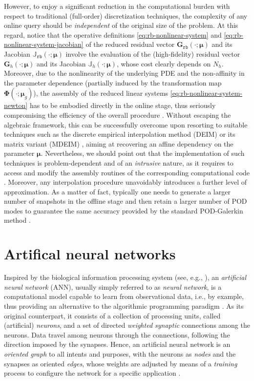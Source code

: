 \documentclass{elsarticle}
\numberwithin{equation}{section}
\theoremstyle{theorem}
\theoremstyle{definition}
\theoremstyle{remark}
\theoremstyle{proposition}
\numberwithin{figure}{section}
\newcommand{\bg}[1]{\boldsymbol{#1}}
\begin{document}
		However, to enjoy a significant reduction in the computational burden with respect to traditional (full-order) discretization techniques, the complexity of any online query should be \emph{independent} of the original size of the problem. At this regard, notice that the operative definitions \eqref{eq:rb-nonlinear-system} and \eqref{eq:rb-nonlinear-system-jacobian} of the reduced residual vector $\mathbf{G}_{\texttt{rb}}(\cdot; \bg{\mu})$ and its Jacobian $\mathbb{J}_{\texttt{rb}}(\cdot; \bg{\mu})$ involve the evaluation of the (high-fidelity) residual vector $\mathbf{G}_h(\cdot; \bg{\mu})$ and its Jacobian $\mathbb{J}_h(\cdot; \bg{\mu})$, whose cost clearly depends on ${N_h}$. Moreover, due to the nonlinearity of the underlying PDE and the non-affinity in the parameter dependence (partially induced by the transformation map $\bg{\Phi}(\cdot; \bg{\mu}_g)$), the assembly of the reduced linear systems \eqref{eq:rb-nonlinear-system-newton} has to be embodied directly in the online stage, thus seriously compromising the efficiency of the overall procedure \cite{Bar04}. Without escaping the algebraic framework, this can be successfully overcome upon resorting to suitable techniques such as the discrete empirical interpolation method (DEIM) \cite{Cha10} or its matrix variant (MDEIM) \cite{NMA15}, aiming at recovering an affine dependency on the parameter $\bg{\mu}$. Nevertheless, we should point out that the implementation of such techniques is problem-dependent and of an \emph{intrusive} nature, as it requires to access and modify the assembly routines of the corresponding computational code \cite{Cas15}. Moreover, any interpolation procedure unavoidably introduces a further level of approximation. As a matter of fact, typically one needs to generate a larger number of snapshots in the offline stage and then retain a larger number of POD modes to guarantee the same accuracy provided by the standard POD-Galerkin method \cite{Bar04}.		
		
		
	
	\section{Artifical neural networks}
	\label{section:Artificial neural networks}
	
		Inspired by the biological information processing system (see, e.g., \cite{Hay05, Kri07}), an \emph{artificial neural network} (ANN), usually simply referred to as \emph{neural network}, is a computational model capable to learn from observational data, i.e., by example, thus providing an alternative to the algorithmic programming paradigm \cite{Nie15}. As its original counterpart, it consists of a collection of processing units, called (artificial) \emph{neurons}, and a set of directed \emph{weighted synaptic} connections among the neurons. Data travel among neurons through the connections, following the direction imposed by the synapses. Hence, an artificial neural network is an \emph{oriented graph} to all intents and purposes, with the neurons as \emph{nodes} and the synapses as oriented \emph{edges}, whose weights are adjusted by means of a \emph{training} process to configure the network for a specific application \cite{SD13}. 
		
\end{document}
